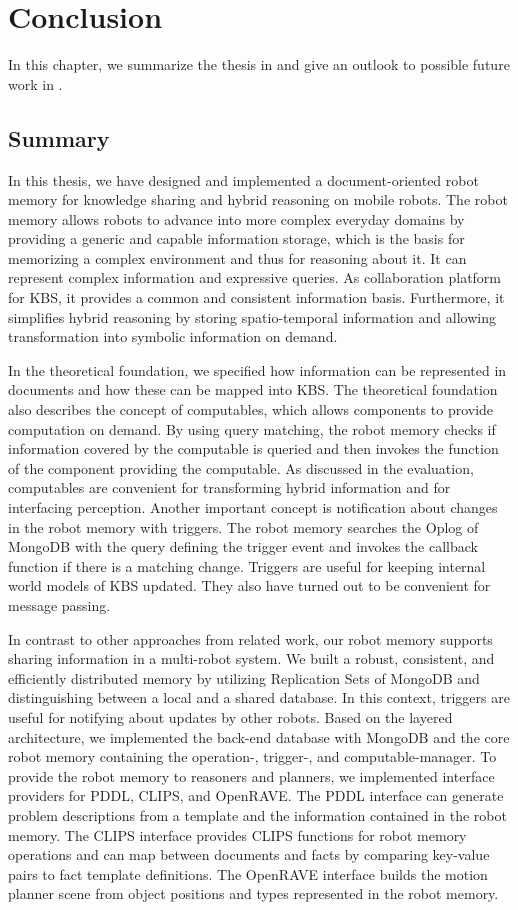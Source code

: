 \chapter{Conclusion}
\label{chap:conclusion}
In this chapter, we summarize the thesis in  and
give an outlook to possible future work in .

\section{Summary}
\label{sec:summary}
In this thesis, we have designed and implemented a document-oriented
robot memory for knowledge sharing and hybrid reasoning on mobile
robots. The robot memory allows robots to advance into more complex
everyday domains by providing a generic and capable
information storage, which is the basis for memorizing a complex
environment and thus for reasoning about it. It can represent complex
information and expressive queries. As collaboration platform for KBS,
it provides a common and consistent information basis. Furthermore, it
simplifies hybrid reasoning by storing spatio-temporal information and
allowing transformation into symbolic information on demand.

In the theoretical foundation, we specified how information can be
represented in documents and how these can be mapped into KBS. The
theoretical foundation also describes the concept of computables,
which allows components to provide computation on demand. By using
query matching, the robot memory checks if information covered by the
computable is queried and then invokes the function of the component
providing the computable. As discussed in the evaluation, computables
are convenient for transforming hybrid information and for interfacing
perception.
%
Another important concept is notification about changes in the robot
memory with triggers. The robot memory searches the Oplog of MongoDB
with the query defining the trigger event and invokes the callback
function if there is a matching change. Triggers are useful for
keeping internal world models of KBS updated. They also have turned
out to be convenient for message passing.

In contrast to other approaches from related work, our robot memory
supports sharing information in a multi-robot system. We built a
robust, consistent, and efficiently distributed memory by utilizing
Replication Sets of MongoDB and distinguishing between a local and a
shared database. In this context, triggers are useful for notifying
about updates by other robots.
%
Based on the layered architecture, we implemented the back-end
database with MongoDB and the core robot memory containing the
operation-, trigger-, and computable-manager. To provide the robot
memory to reasoners and planners, we implemented interface providers
for PDDL, CLIPS, and OpenRAVE. The PDDL interface can generate problem
descriptions from a template and the information contained in the
robot memory. The CLIPS interface provides CLIPS functions for robot
memory operations and can map between documents and facts by comparing
key-value pairs to fact template definitions. The OpenRAVE interface
builds the motion planner scene from object positions and types
represented in the robot memory.

